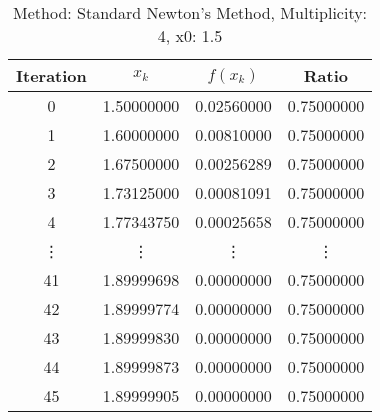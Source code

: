 \begin{table}
\centering
\caption{Method: Standard Newton's Method, Multiplicity: 4, x0: 1.5}
\label{tab:table_Standard_Newton's_Method_4_1_5}
\begin{tabular}{c c c c}
\toprule
Iteration &      $x_k$ &   $f(x_k)$ &      Ratio \\
\midrule
        0 & 1.50000000 & 0.02560000 & 0.75000000 \\
        1 & 1.60000000 & 0.00810000 & 0.75000000 \\
        2 & 1.67500000 & 0.00256289 & 0.75000000 \\
        3 & 1.73125000 & 0.00081091 & 0.75000000 \\
        4 & 1.77343750 & 0.00025658 & 0.75000000 \\
   \vdots &     \vdots &     \vdots &     \vdots \\
       41 & 1.89999698 & 0.00000000 & 0.75000000 \\
       42 & 1.89999774 & 0.00000000 & 0.75000000 \\
       43 & 1.89999830 & 0.00000000 & 0.75000000 \\
       44 & 1.89999873 & 0.00000000 & 0.75000000 \\
       45 & 1.89999905 & 0.00000000 & 0.75000000 \\
\bottomrule
\end{tabular}
\end{table}
